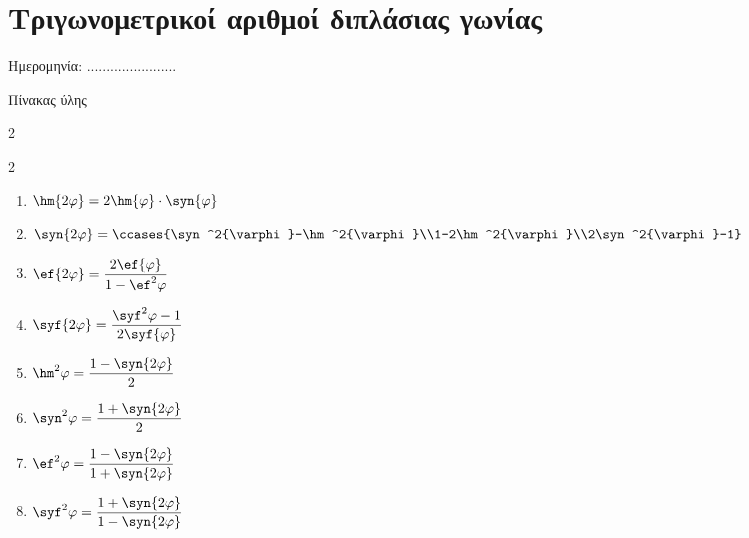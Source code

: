\documentclass[twoside,nofonts,internet,math,spyros]{frontisthrio}
\newcommand{\myitem}{\stepcounter{enumi}\item[\raisebox{0.5mm}{\faEdit}\ \Large$\square$]}
\begin{document}
\section{Τριγωνομετρικοί αριθμοί διπλάσιας γωνίας}
\begin{flushright}
\faCalendar* Ημερομηνία: .......................
\end{flushright}
\begin{mybox}[mysubtitle]{Πίνακας ύλης}
\begin{multicols}{2}
\begin{todolist}[itemsep=0mm]
\myitem 
\end{todolist}
\end{multicols}
\begin{multicols}{2}
\begin{enumerate}[itemsep=0mm]
\item $ \hm{2\varphi}=2\hm{\varphi}\cdot\syn{\varphi} $
\item $ \syn{2\varphi}=\ccases{\syn^2{\varphi}-\hm^2{\varphi}\\1-2\hm^2{\varphi}\\2\syn^2{\varphi}-1} $
\item $ \ef{2\varphi}=\dfrac{2\ef{\varphi}}{1-\ef^2{\varphi}}$
\item $ \syf{2\varphi}=\dfrac{\syf^2{\varphi}-1}{2\syf{\varphi}} $
\item $ \hm^2{\varphi}=\dfrac{1-\syn{2\varphi}}{2} $
\item $ \syn^2{\varphi}=\dfrac{1+\syn{2\varphi}}{2} $
\item $ \ef^2{\varphi}=\dfrac{1-\syn{2\varphi}}{1+\syn{2\varphi}} $
\item $ \syf^2{\varphi}=\dfrac{1+\syn{2\varphi}}{1-\syn{2\varphi}} $
\end{enumerate}
\end{multicols}
\end{mybox}

\newpage
\end{document}
